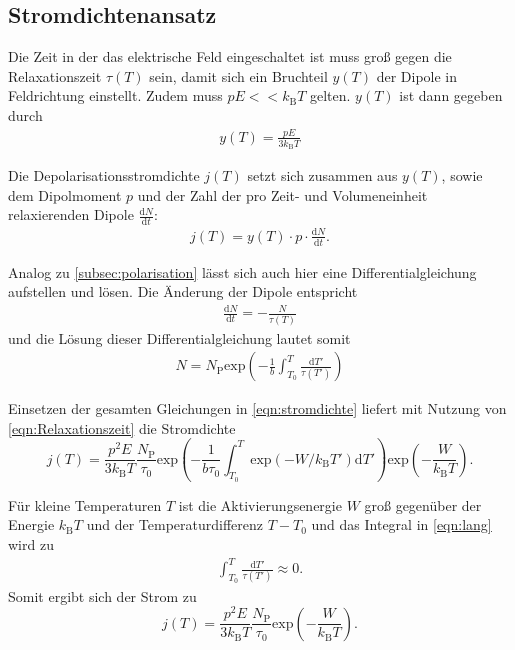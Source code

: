 \subsection{Stromdichtenansatz}

Die Zeit in der das elektrische Feld eingeschaltet ist muss groß gegen die Relaxationszeit $\tau(T)$ sein, 
damit sich ein Bruchteil $y(T)$ der Dipole in Feldrichtung einstellt.
Zudem muss $pE << k_\text{B}T$ gelten.
$y(T)$ ist dann gegeben durch
\begin{align*}
    y(T)= \frac{pE}{3 k_\text{B}T}
\end{align*}

Die Depolarisationsstromdichte $j(T)$ setzt sich zusammen aus $y(T)$, sowie dem Dipolmoment $p$ und der Zahl der pro Zeit- und Volumeneinheit 
relaxierenden Dipole $\frac{\text{d}N}{\text{d}t}$:
\begin{align}
    j(T) = y(T) \cdot p \cdot \frac{\text{d}N}{\text{d}t}.
    \label{eqn:stromdichte}
\end{align}

Analog zu \autoref{subsec:polarisation} lässt sich auch hier eine Differentialgleichung aufstellen und lösen.
Die Änderung der Dipole entspricht
\begin{align}
    \frac{\text{d} N}{\text{d} t} = -\frac{N}{\tau(T)}
\end{align}
und die Lösung dieser Differentialgleichung lautet somit 
\begin{align}
    N = N_\text{P} \text{exp}\left(-\frac{1}{b}\int_{T_0}^T\frac{\text{d}T'}{\tau(T')}\right)
\end{align}

Einsetzen der gesamten Gleichungen in \autoref{eqn:stromdichte} liefert mit Nutzung von \autoref{eqn:Relaxationszeit} die Stromdichte
\begin{equation}
  j(T) = \frac{p^2E}{3k_\text{B}T}\frac{N_\text{P}}{\tau_0}\text{exp}\left(-\frac{1}{b\tau_0}\int_{T_0}^T\text{exp}(-W/ k_ \text{B}T')\text{d}T'\right)\text{exp}\left(-\frac{W}{k_\text{B}T}\right).
 \label{eqn:lang}
\end{equation}

Für kleine Temperaturen $T$ ist die Aktivierungsenergie $W$ groß gegenüber der Energie $k_\text{B}T$ und der Temperaturdifferenz $T-T_0$ und das Integral in \autoref{eqn:lang} wird zu
\begin{align}
    \int_{T_0}^T\frac{\text{d}T'}{\tau(T')} \approx 0.
\end{align}
Somit ergibt sich der Strom zu
\begin{equation}
    j(T) = \frac{p^2E}{3k_\text{B}T}\frac{N_\text{P}}{\tau_0} \text{exp}\left(-\frac{W}{k_\text{B}T}\right).
    \label{eqn:kurz}
\end{equation}


